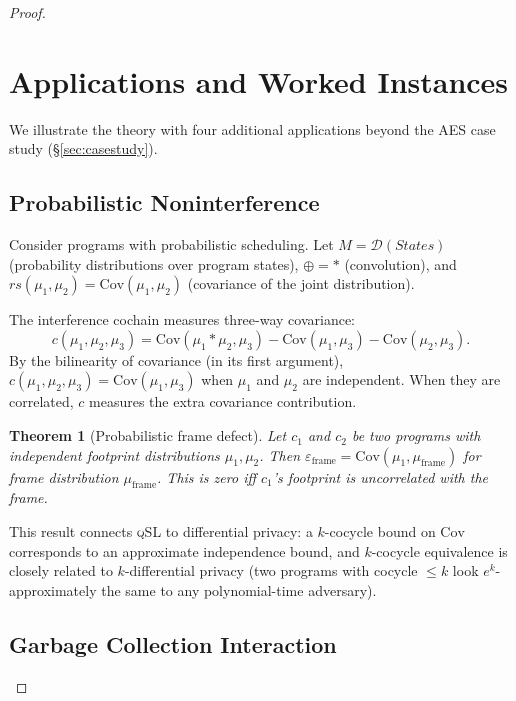 \documentclass[acmsmall,sigplan,anonymous,review,screen]{acmart}
\theoremstyle{plain}
\newtheorem{theorem}{Theorem}[section]
\theoremstyle{definition}
\newcommand{\qSL}{\textsc{qSL}\xspace}
\newcommand{\rs}{\mathit{rs}}
\newcommand{\defect}{\varepsilon}
\begin{document}
\begin{proof}
\section{Applications and Worked Instances}
\label{sec:applications}

We illustrate the theory with four additional applications beyond the
AES case study (\S\ref{sec:casestudy}).

\subsection{Probabilistic Noninterference}
\label{sec:applications:prob}

Consider programs with probabilistic scheduling.  Let
$M = \mathcal{D}(\mathit{States})$ (probability distributions over
program states), $\oplus = *$ (convolution), and $\rs(\mu_1, \mu_2) =
\mathrm{Cov}(\mu_1, \mu_2)$ (covariance of the joint distribution).

The interference cochain measures three-way covariance:
\[
  c(\mu_1, \mu_2, \mu_3) = \mathrm{Cov}(\mu_1 * \mu_2, \mu_3)
    - \mathrm{Cov}(\mu_1, \mu_3) - \mathrm{Cov}(\mu_2, \mu_3).
\]
By the bilinearity of covariance (in its first argument), $c(\mu_1, \mu_2, \mu_3)
= \mathrm{Cov}(\mu_1, \mu_3)$ when $\mu_1$ and $\mu_2$ are independent.
When they are correlated, $c$ measures the extra covariance contribution.

\begin{theorem}[Probabilistic frame defect]
  Let $c_1$ and $c_2$ be two programs with independent footprint
  distributions $\mu_1, \mu_2$.  Then
  $\defect_{\mathrm{frame}} = \mathrm{Cov}(\mu_1, \mu_{\mathrm{frame}})$
  for frame distribution $\mu_{\mathrm{frame}}$.  This is zero iff
  $c_1$'s footprint is uncorrelated with the frame.
\end{theorem}

This result connects \qSL to differential privacy: a $k$-cocycle bound
on $\mathrm{Cov}$ corresponds to an approximate independence bound, and
$k$-cocycle equivalence is closely related to $k$-differential privacy
(two programs with cocycle $\leq k$ look $e^k$-approximately the same
to any polynomial-time adversary).

\subsection{Garbage Collection Interaction}
\label{sec:applications:gc}


\end{proof}
\end{document}
